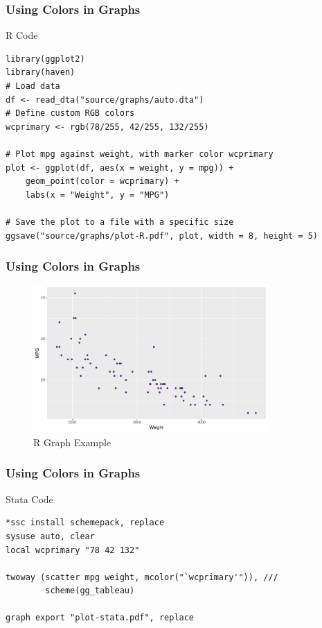 \documentclass[aspectratio=1610]{beamer}
\begin{document}
\begin{frame}[fragile]
    \frametitle{Using Colors in Graphs}
    \begin{tblock}{R Code}
        \footnotesize
        \begin{verbatim}
library(ggplot2)
library(haven)
# Load data
df <- read_dta("source/graphs/auto.dta")
# Define custom RGB colors
wcprimary <- rgb(78/255, 42/255, 132/255)

# Plot mpg against weight, with marker color wcprimary
plot <- ggplot(df, aes(x = weight, y = mpg)) +
    geom_point(color = wcprimary) +
    labs(x = "Weight", y = "MPG")

# Save the plot to a file with a specific size
ggsave("source/graphs/plot-R.pdf", plot, width = 8, height = 5)
        \end{verbatim}
    \end{tblock}
\end{frame}



\begin{frame}[fragile]
    \frametitle{Using Colors in Graphs}
    \begin{figure}
        \centering
        \includegraphics[width=0.8\textwidth]{graphs/plot-R.pdf}
        \caption{R Graph Example}
        \label{fig:graph-R}
    \end{figure}
\end{frame}

\begin{frame}[fragile]
    \frametitle{Using Colors in Graphs}
    \begin{tblock}{Stata Code}
        \footnotesize
        \begin{verbatim}
*ssc install schemepack, replace
sysuse auto, clear
local wcprimary "78 42 132"

twoway (scatter mpg weight, mcolor("`wcprimary'")), ///
        scheme(gg_tableau)
        
graph export "plot-stata.pdf", replace
        \end{verbatim}
    \end{tblock}
\end{frame}
\end{document}
